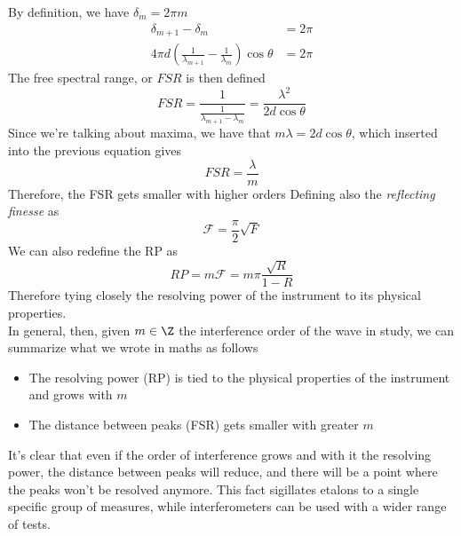 \documentclass[../electromagnetism.tex]{subfiles}
\begin{document}
By definition, we have $\delta_m=2\pi m$
\begin{equation}
	\begin{aligned}
		\delta_{m+1}-\delta_m&= 2\pi\\
		4\pi d\left( \frac{1}{\lambda_{m+1}}-\frac{1}{\lambda_m} \right)\cos\theta&= 2\pi
	\end{aligned}
	\label{eq:fsrdef.fpi}
\end{equation}
The free spectral range, or $FSR$ is then defined
\begin{equation*}
	FSR=\frac{1}{\frac{1}{\lambda_{m+1}-\lambda_m}}=\frac{\lambda^2}{2d\cos\theta}
\end{equation*}
Since we're talking about maxima, we have that $m\lambda=2d\cos\theta$, which inserted into the previous equation gives
\begin{equation}
	FSR=\frac{\lambda}{m}
	\label{eq:fsr.fpi}
\end{equation}
Therefore, the FSR gets smaller with higher orders
Defining also the \textit{reflecting finesse} as
\begin{equation}
	\mathcal{F}=\frac{\pi}{2}\sqrt{F}
	\label{eq:reffinesse.fpi}
\end{equation}
We can also redefine the RP as
\begin{equation}
	RP=m\mathcal{F}=m\pi\frac{\sqrt{R}}{1-R}
	\label{eq:rprfin.fpi}
\end{equation}
Therefore tying closely the resolving power of the instrument to its physical properties.\\
In general, then, given $m\in\Z$ the interference order of the wave in study, we can summarize what we wrote in maths as follows
\begin{itemize}
\item The resolving power (RP) is tied to the physical properties of the instrument and grows with $m$
\item The distance between peaks (FSR) gets smaller with greater $m$
\end{itemize}
It's clear that even if the order of interference grows and with it the resolving power, the distance between peaks will reduce, and there will be a point where the peaks won't be resolved anymore. This fact sigillates etalons to a single specific group of measures, while interferometers can be used with a wider range of tests.\\
\end{document}
